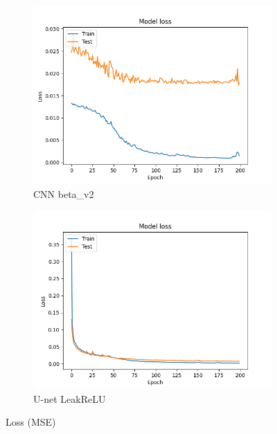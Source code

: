 \documentclass[10pt,twocolumn,letterpaper]{article}
\begin{document}
\begin{figure}[H]
  \centering
  \begin{subfigure}[b]{0.45\linewidth}
    \includegraphics[width=\linewidth]{fig8}
     \caption{CNN beta\_v2}
  \end{subfigure}
  \begin{subfigure}[b]{0.45\linewidth}
    \includegraphics[width=\linewidth]{fig5}
    \caption{U-net LeakReLU}
  \end{subfigure}
  \caption{Loss (MSE)}
\end{figure}
\end{document}

